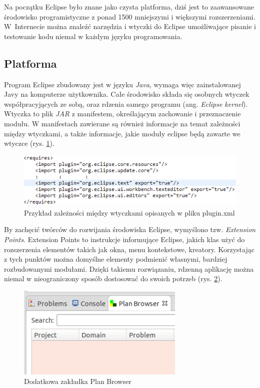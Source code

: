 Na początku Eclipse było znane jako czysta platforma, dziś jest to zaawansowane środowisko programistyczne z ponad 1500 mniejszymi i większymi rozszerzeniami. W~Internecie można znaleźć narzędzia i wtyczki do Eclipse umożliwające pisanie i testowanie kodu niemal w każdym języku programowania.

\subsection{Platforma}
\label{subsec:platforma}
Program Eclipse zbudowany jest w języku \emph{Java}, wymaga więc zainstalowanej Javy na komputerze użytkownika.  Całe środowisko składa się osobnych wtyczek współpracyjących ze sobą, oraz rdzenia samego programu (ang. \emph{Eclipse kernel}). Wtyczka to plik \emph{JAR} z manifestem, określającym zachowanie i przeznaczenie modułu. W manifestach zawierane są również informacje na temat zależności między wtyczkami, a także informacje, jakie moduły eclipse będą zawarte we wtyczce (rys. \ref{eclipse_example}).
\begin{figure}[h]
  \centering
    \includegraphics[width=\textwidth]{img/eclipse-example.png}
    \caption{Przykład zależności między wtyczkami opisanych w pliku plugin.xml}
    \label{eclipse_example}
\end{figure}

By zachęcić twórców do rozwijania środowiska Eclipse, wymyślono tzw. \emph{Extension Points}. Extension Points to instrukcje informujące Eclipse, jakich klas użyć do rozszerzenia elementów takich jak okna, menu kontekstowe, kreatory. Korzystając z tych punktów można domyślne elementy podmienić własnymi, bardziej rozbudowanymi modułami. Dzięki takiemu rozwiązaniu, rdzenną aplikację można niemal w nieograniczony sposób dostosować do swoich potrzeb (rys. \ref{eclipse_custom}).

\begin{figure}[h]
  \centering
    \includegraphics[width=8cm]{img/custom-window.png}
    \caption{Dodatkowa zakładka Plan Browser}
    \label{eclipse_custom}
\end{figure}

